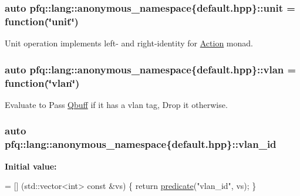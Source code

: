 \subsubsection[{\texorpdfstring{unit}{unit}}]{\setlength{\rightskip}{0pt plus 5cm}auto pfq\+::lang\+::anonymous\+\_\+namespace\{default.\+hpp\}\+::unit = {\bf function}(\char`\"{}unit\char`\"{})}\hypertarget{namespacepfq_1_1lang_1_1anonymous__namespace_02default_8hpp_03_a85f9b2d401cbb1d135679160de0e97de}{}\label{namespacepfq_1_1lang_1_1anonymous__namespace_02default_8hpp_03_a85f9b2d401cbb1d135679160de0e97de}


Unit operation implements left-\/ and right-\/identity for \hyperlink{structpfq_1_1lang_1_1Action}{Action} monad. 

\subsubsection[{\texorpdfstring{vlan}{vlan}}]{\setlength{\rightskip}{0pt plus 5cm}auto pfq\+::lang\+::anonymous\+\_\+namespace\{default.\+hpp\}\+::vlan = {\bf function}(\char`\"{}vlan\char`\"{})}\hypertarget{namespacepfq_1_1lang_1_1anonymous__namespace_02default_8hpp_03_a747e907a678ad69c5bfdd3048a239b6a}{}\label{namespacepfq_1_1lang_1_1anonymous__namespace_02default_8hpp_03_a747e907a678ad69c5bfdd3048a239b6a}


Evaluate to {\ttfamily Pass} \hyperlink{structpfq_1_1lang_1_1Qbuff}{Qbuff} if it has a vlan tag, {\ttfamily Drop} it otherwise. 

\subsubsection[{\texorpdfstring{vlan\+\_\+id}{vlan_id}}]{\setlength{\rightskip}{0pt plus 5cm}auto pfq\+::lang\+::anonymous\+\_\+namespace\{default.\+hpp\}\+::vlan\+\_\+id}\hypertarget{namespacepfq_1_1lang_1_1anonymous__namespace_02default_8hpp_03_ad2a631020f34bf10335ebb0e79f03920}{}\label{namespacepfq_1_1lang_1_1anonymous__namespace_02default_8hpp_03_ad2a631020f34bf10335ebb0e79f03920}
{\bfseries Initial value\+:}
\begin{DoxyCode}
= [] (std::vector<int> \textcolor{keyword}{const} &vs) \{
                                    \textcolor{keywordflow}{return} \hyperlink{namespacepfq_1_1lang_aca9adafc436b7f851621b979fa1aaf88}{predicate}(\textcolor{stringliteral}{"vlan\_id"}, vs);
                                \}
\end{DoxyCode}


